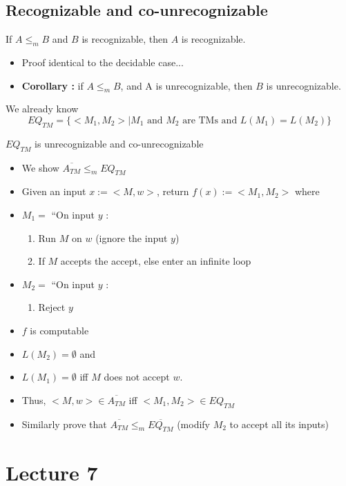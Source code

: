 \documentclass[12pt,a4paper]{article}
\newcommand{\atm}{\ensuremath{A_{TM}} }
\newcommand{\eqtm}{\ensuremath{EQ_{TM}} }
\newcommand{\<}{\langle}
\renewcommand{\>}{\rangle}
\begin{document}
\subsection{Recognizable and co-unrecognizable}
\begin{boite}
    If $A \leq_m B$ and $B$ is recognizable, then $A$ is recognizable.
\end{boite}
\begin{itemize}
    \item Proof identical to the decidable case...
    \item \textbf{Corollary :} if $A \leq_m B$, and A is unrecognizable, then $B$ is unrecognizable.
\end{itemize}
We already know 
\[\eqtm = \{<M_1,M_2> | M_1 \text{ and } M_2 \text{ are TMs and } L(M_1) = L(M_2)\}\]
\begin{boite}
     \eqtm is unrecognizable and co-unrecognizable
\end{boite} 
\begin{itemize}
    \item We show $\overline{\atm} \leq_m \eqtm$
    \item Given an input $x := <M,w>$, return $f(x) := <M_1,M_2>$ where
    \item $M_1 =$ ``On input $y$ :
            \begin{enumerate}
                \item Run $M$ on $w$ (ignore the input $y$)
                \item If $M$ accepts the accept, else enter an infinite loop
            \end{enumerate}
    \item $M_2 =$ ``On input $y$ :
            \begin{enumerate}
                \item Reject $y$
            \end{enumerate}
    \item $f$ is computable
    \item $L(M_2) = \emptyset$ and
    \item $L(M_1) = \emptyset$ iff $M$ does not accept $w$.
    \item Thus, $<M,w> \in \overline{\atm}$ iff $<M_1,M_2> \in \eqtm$
    \item Similarly prove that $\overline{\atm} \leq_m \overline{\eqtm}$ (modify $M_2$ to accept all its inputs)
\end{itemize}
\section{Lecture 7}
\end{document}
